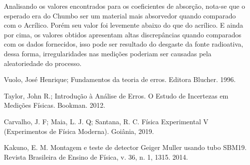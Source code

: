 \documentclass{article}
\begin{document}
Analisando os valores encontrados para os coeficientes de absorção, nota-se que o esperado era do Chumbo ser um material mais absorvedor quando comparado com o Acrílico. Porém seu valor foi levemente abaixo do que do acrílico. E ainda por cima, os valores obtidos apresentam altas discrepâncias quando comparados com os dados fornecidos, isso pode ser resultado do desgaste da fonte radioativa, dessa forma, irregularidades nas medições
poderiam ser causadas pela aleatoriedade do processo.


\begin{thebibliography}{99}
    Vuolo, Jos{\'e} Henrique;
    Fundamentos da teoria de erros.
    Editora Blucher.
    1996.
    
    Taylor, John R.;
    Introdução à Análise de Erros. O Estudo de Incertezas em Medições Físicas.
    Bookman.
    2012.
    
    Carvalho, J. F; Maia, L. J. Q; Santana, R. C.
    Física Experimental V (Experimentos de Física Moderna).
    Goiânia, 2019.
    
    Kakuno, E. M.
    Montagem e teste de detector Geiger Muller usando tubo SBM19.
    Revista Brasileira de Ensino de Física, v. 36, n. 1, 1315.
    2014.
    
\end{thebibliography}
\end{document}
